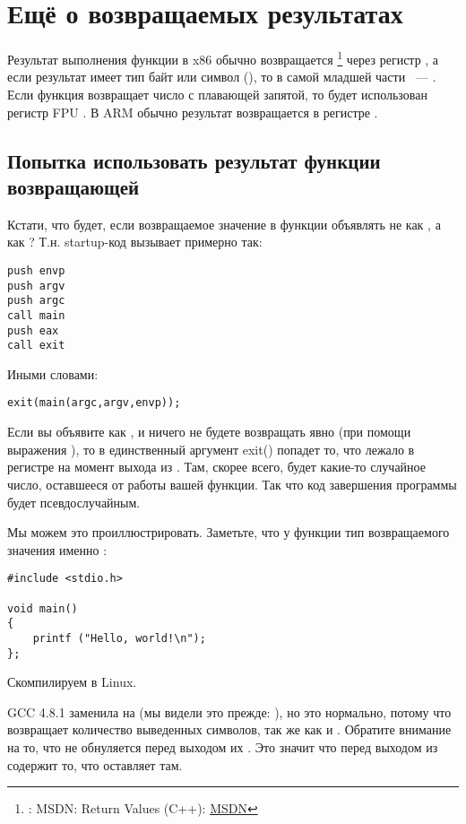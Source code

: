 \chapter{Ещё о возвращаемых результатах}

Результат выполнения функции в x86 обычно возвращается
\footnote{\Seealso: MSDN: Return Values (C++): \href{http://go.yurichev.com/17258}{MSDN}}
через регистр \EAX, а если результат имеет тип байт или символ (\Tchar), 
то в самой младшей части \EAX~--- \AL. Если функция возвращает число с плавающей запятой, 
то будет использован регистр FPU .
В ARM обычно результат возвращается в регистре .

\section{Попытка использовать результат функции возвращающей \Tvoid}

Кстати, что будет, если возвращаемое значение в функции \main объявлять не как \Tint, а как \Tvoid?
Т.н. startup-код вызывает \main примерно так:

\begin{lstlisting}
push envp
push argv
push argc
call main
push eax
call exit
\end{lstlisting}

Иными словами:

\begin{lstlisting}
exit(main(argc,argv,envp));
\end{lstlisting}

Если вы объявите \main как \Tvoid, и ничего не будете возвращать явно (при помощи выражения ), то в единственный аргумент exit() попадет то, что лежало в регистре \EAX на момент выхода из \main.
Там, скорее всего, будет какие-то случайное число, оставшееся от работы вашей функции. Так что код завершения программы будет псевдослучайным.

Мы можем это проиллюстрировать.
Заметьте, что у функции \main тип возвращаемого значения именно \Tvoid{}:

\begin{lstlisting}
#include <stdio.h>

void main()
{
	printf ("Hello, world!\n");
};
\end{lstlisting}

Скомпилируем в Linux.

GCC 4.8.1 заменила \printf на \puts 
(мы видели это прежде: ), но это нормально, потому что \puts возвращает количество
выведенных символов, так же как и \printf.
Обратите внимание на то, что \EAX не обнуляется перед выходом их \main.
Это значит что \EAX перед выходом из \main содержит то, что \puts оставляет там.


